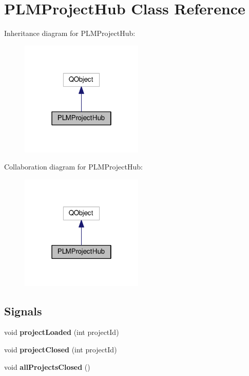 \hypertarget{class_p_l_m_project_hub}{}\section{P\+L\+M\+Project\+Hub Class Reference}
\label{class_p_l_m_project_hub}


Inheritance diagram for P\+L\+M\+Project\+Hub\+:\nopagebreak
\begin{figure}[H]
\begin{center}
\leavevmode
\includegraphics[width=166pt]{class_p_l_m_project_hub__inherit__graph}
\end{center}
\end{figure}


Collaboration diagram for P\+L\+M\+Project\+Hub\+:\nopagebreak
\begin{figure}[H]
\begin{center}
\leavevmode
\includegraphics[width=166pt]{class_p_l_m_project_hub__coll__graph}
\end{center}
\end{figure}
\subsection*{Signals}
\begin{DoxyCompactItemize}
\item 
void {\bfseries project\+Loaded} (int project\+Id)\hypertarget{class_p_l_m_project_hub_a86ecd1dcdf8b27ca9ccd54285024406f}{}\label{class_p_l_m_project_hub_a86ecd1dcdf8b27ca9ccd54285024406f}

\item 
void {\bfseries project\+Closed} (int project\+Id)\hypertarget{class_p_l_m_project_hub_ab9bc05ad5de40a210db6f784c7ac96b0}{}\label{class_p_l_m_project_hub_ab9bc05ad5de40a210db6f784c7ac96b0}

\item 
void {\bfseries all\+Projects\+Closed} ()\hypertarget{class_p_l_m_project_hub_aec818fb471b7a5896121ab4851a166ab}{}\label{class_p_l_m_project_hub_aec818fb471b7a5896121ab4851a166ab}

\end{DoxyCompactItemize}
